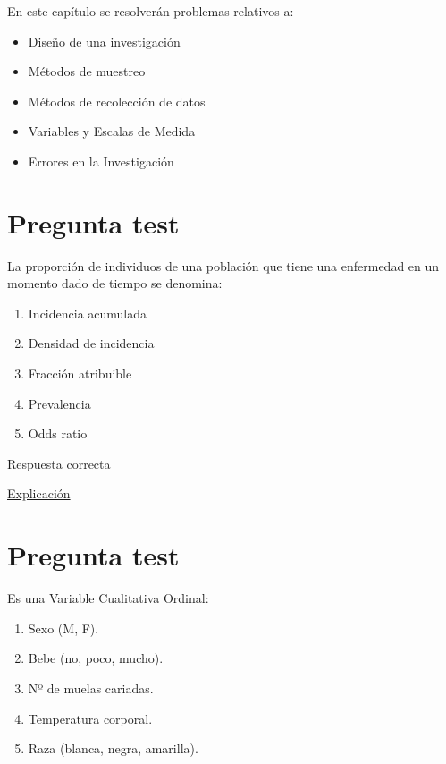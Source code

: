 \documentclass[
]{book}
\providecommand{\tightlist}{%
  \setlength{\itemsep}{0pt}\setlength{\parskip}{0pt}}
\begin{document}
En este capítulo se resolverán problemas relativos a:

\begin{itemize}
\tightlist
\item
  Diseño de una investigación
\item
  Métodos de muestreo
\item
  Métodos de recolección de datos
\item
  Variables y Escalas de Medida
\item
  Errores en la Investigación
\end{itemize}

\hypertarget{pregunta-test}{%
\section{Pregunta test}\label{pregunta-test}}

La proporción de individuos de una población que tiene una enfermedad en un momento dado de tiempo se denomina:

\begin{enumerate}
\def\labelenumi{\alph{enumi})}
\tightlist
\item
  Incidencia acumulada
\item
  Densidad de incidencia
\item
  Fracción atribuible
\item
  Prevalencia
\item
  Odds ratio
\end{enumerate}

Respuesta correcta

\href{https://www.cancer.gov/espanol/publicaciones/diccionarios/diccionario-cancer/def/prevalencia}{Explicación}

\hypertarget{pregunta-test-1}{%
\section{Pregunta test}\label{pregunta-test-1}}

Es una Variable Cualitativa Ordinal:

\begin{enumerate}
\def\labelenumi{\alph{enumi})}
\tightlist
\item
  Sexo (M, F).
\item
  Bebe (no, poco, mucho).
\item
  Nº de muelas cariadas.
\item
  Temperatura corporal.
\item
  Raza (blanca, negra, amarilla).
\end{enumerate}
\end{document}
